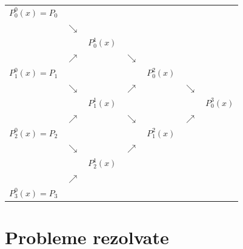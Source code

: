 \documentclass{exam}
\begin{document}
\begin{center}
	\begin{tabular}{ccccccc}
		$P_{0}^{0}(x)=P_0$ & {}          & {}                                                                           \\
		{}                 & $\searrow $ & {}             & {}                                                          \\
		{}                 & {}          & $P_{0}^{1}(x)$ & {}                                                          \\
		{}                 & $\nearrow $ & {}             & $\searrow $                                                 \\
		$P_{1}^{0}(x)=P_1$ & {}          & {}             & {}          & $P_{0}^{2}(x)$                                \\
		{}                 & $\searrow $ & {}             & $\nearrow $ & {}             & $\searrow $                  \\
		{}                 & {}          & $P_{1}^{1}(x)$ & {}          & {}             & {}          & $P_{0}^{3}(x)$ \\
		{}                 & $\nearrow $ & {}             & $\searrow $ & {}             & $\nearrow$                   \\
		$P_{2}^{0}(x)=P_2$ & {}          & {}             & {}          & $P_{1}^{2}(x)$                                \\
		{}                 & $\searrow $ & {}             & $\nearrow $                                                 \\
		{}                 & {}          & $P_{2}^{1}(x)$ & {}                                                          \\
		{}                 & $\nearrow $ & {}                                                                           \\
		$P_{3}^{0}(x)=P_3$ & {}          & {}             & {}                                                          \\
	\end{tabular}
\end{center}

\section{Probleme rezolvate}

\end{document}
